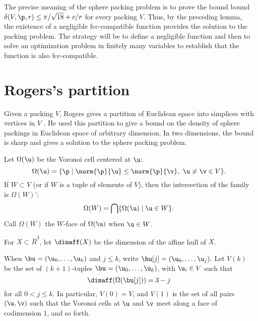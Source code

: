 \begin{remark} \label{remark:precise} The precise meaning of the
sphere packing problem is to prove the bound bound $\delta( V,\p,r)
\le \pi/\sqrt{18} + c/r$ for every packing $ V$.  Thus, by the
preceding lemma, the existence of a negligible fcc-compatible
function provides the solution to the packing problem.  The strategy
will be to define a negligible function and then to solve an
optimization problem in finitely many variables to establish that
the function is also fcc-compatible.
\end{remark}



\section{Rogers's partition}\label{sec:rogers}





Given a packing $ V$, Rogers gives a partition of Euclidean space into
simplices with vertices in $ V$ \cite{Rogers:1958:Packing}.  He used
this partition to give a bound on the density of sphere packings in
Euclidean space of arbitrary dimension.  In two dimensions, the bound
is sharp and gives a solution to the sphere packing problem.

Let $\Omega( \u)$  be the Voronoi cell centered at $ \u$:
\begin{displaymath}
\Omega( \u) = \{\p \mid  \norm{\p}{ \u} 
\le \norm{\p}{\v},\  \u\ne\v\in V\}.
\end{displaymath}
If $W\subset V$ (or if $W$ is a tuple of elements of $ V$), 
then the intersection of the family is  $\Omega(W)$':
\begin{displaymath}\Omega(W) = \bigcap \{\Omega( \u)\mid \u\in W
\}.\end{displaymath}
Call $\Omega(W)$ the $W$-face of $\Omega( \u)$ when $ \u\in W$.

For $X\subset\ring{R}^3$, let $\dimaff(X)$ be the dimension of the
affine hull of $X$.

When $\bu=( \u_0,\ldots, \u_k)$ and $j\le k$, write $\bu[j] = (
\u_0,\ldots, \u_j)$.  Let $ V(k)$ be the set of $(k\!+\!1)$-tuples
$\bu=( \u_0,\ldots, \u_k)$, with $ \u_i\in V$ such that
\begin{equation}\label{eqn:omega-dim}
\dimaff(\Omega(\bu[j])) = 3-j
\end{equation}
for all $0<j\le k$.  In particular, $ V(0)= V$, and $ V(1)$ is the set
of all pairs $( \u,\v)$ such that the Voronoi cells at $ \u$ and $\v$
meet along a face of codimension $1$, and so forth.


